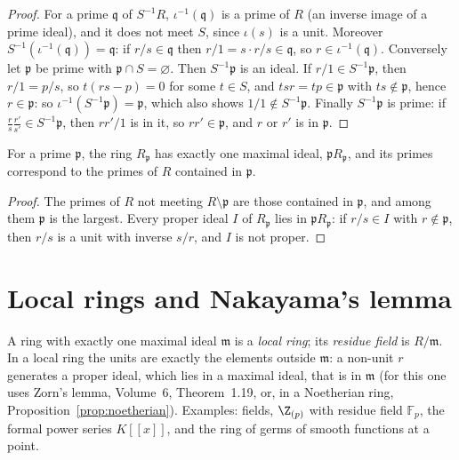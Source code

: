 \begin{proof}
For a prime $\mathfrak q$ of $S^{-1}R$, $\iota^{-1}(\mathfrak q)$ is a prime of $R$ (an inverse image of a prime ideal), and it does not meet $S$, since $\iota(s)$ is a unit. Moreover $S^{-1}(\iota^{-1}(\mathfrak q))=\mathfrak q$: if $r/s\in\mathfrak q$
then $r/1=s\cdot r/s\in\mathfrak q$, so $r\in\iota^{-1}(\mathfrak q)$. Conversely let $\mathfrak p$ be prime with $\mathfrak p\cap S=\varnothing$. Then $S^{-1}\mathfrak p$ is an ideal. If $r/1\in S^{-1}\mathfrak p$, then $r/1=p/s$, so $t(rs-p)=0$ for some
$t\in S$, and $tsr=tp\in\mathfrak p$ with $ts\notin\mathfrak p$, hence $r\in\mathfrak p$: so $\iota^{-1}(S^{-1}\mathfrak p)=\mathfrak p$, which also shows $1/1\notin S^{-1}\mathfrak p$. Finally $S^{-1}\mathfrak p$ is prime: if
$\frac rs\frac{r'}{s'}\in S^{-1}\mathfrak p$, then $rr'/1$ is in it, so $rr'\in\mathfrak p$, and $r$ or $r'$ is in $\mathfrak p$.
\end{proof}

\begin{corollary}\label{cor:localring}
For a prime $\mathfrak p$, the ring $R_{\mathfrak p}$ has exactly one maximal ideal, $\mathfrak pR_{\mathfrak p}$, and its primes correspond to the primes of $R$ contained in $\mathfrak p$.
\end{corollary}

\begin{proof}
The primes of $R$ not meeting $R\setminus\mathfrak p$ are those contained in $\mathfrak p$, and among them $\mathfrak p$ is the largest. Every proper ideal $I$ of $R_{\mathfrak p}$ lies in $\mathfrak pR_{\mathfrak p}$: if $r/s\in I$ with $r\notin\mathfrak p$, then $r/s$ is
a unit with inverse $s/r$, and $I$ is not proper.
\end{proof}

\section{Local rings and Nakayama's lemma}

A ring with exactly one maximal ideal $\mathfrak m$ is a \emph{local ring}; its \emph{residue field} is $R/\mathfrak m$. In a local ring the units are exactly the elements outside $\mathfrak m$: a non-unit $r$ generates a proper ideal,
which lies in a maximal ideal, that is in $\mathfrak m$ (for this one uses Zorn's lemma, Volume~6, Theorem~1.19, or, in a Noetherian ring, Proposition~\ref{prop:noetherian}). Examples: fields, $\Z_{(p)}$ with residue field $\mathbb F_p$, the
formal power series $K[[x]]$, and the ring of germs of smooth functions at a point.

